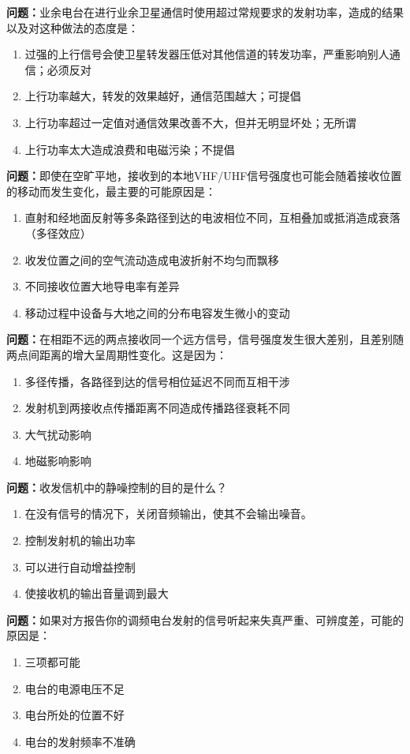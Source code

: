 \documentclass{ctexbook}
\begin{document}
\textbf{问题：}业余电台在进行业余卫星通信时使用超过常规要求的发射功率，造成的结果以及对这种做法的态度是：
\begin{enumerate}[label=\Alph*), leftmargin=3em]
\item 过强的上行信号会使卫星转发器压低对其他信道的转发功率，严重影响别人通信；必须反对
\item 上行功率越大，转发的效果越好，通信范围越大；可提倡
\item 上行功率超过一定值对通信效果改善不大，但并无明显坏处；无所谓
\item 上行功率太大造成浪费和电磁污染；不提倡
\end{enumerate}

\textbf{问题：}即使在空旷平地，接收到的本地VHF/UHF信号强度也可能会随着接收位置的移动而发生变化，最主要的可能原因是：
\begin{enumerate}[label=\Alph*), leftmargin=3em]
\item 直射和经地面反射等多条路径到达的电波相位不同，互相叠加或抵消造成衰落（多径效应）
\item 收发位置之间的空气流动造成电波折射不均匀而飘移
\item 不同接收位置大地导电率有差异
\item 移动过程中设备与大地之间的分布电容发生微小的变动
\end{enumerate}

\textbf{问题：}在相距不远的两点接收同一个远方信号，信号强度发生很大差别，且差别随两点间距离的增大呈周期性变化。这是因为：
\begin{enumerate}[label=\Alph*), leftmargin=3em]
\item 多径传播，各路径到达的信号相位延迟不同而互相干涉
\item 发射机到两接收点传播距离不同造成传播路径衰耗不同
\item 大气扰动影响
\item 地磁影响影响
\end{enumerate}

\textbf{问题：}收发信机中的静噪控制的目的是什么？
\begin{enumerate}[label=\Alph*), leftmargin=3em]
\item 在没有信号的情况下，关闭音频输出，使其不会输出噪音。
\item 控制发射机的输出功率
\item 可以进行自动增益控制
\item 使接收机的输出音量调到最大
\end{enumerate}

\textbf{问题：}如果对方报告你的调频电台发射的信号听起来失真严重、可辨度差，可能的原因是：
\begin{enumerate}[label=\Alph*), leftmargin=3em]
\item 三项都可能
\item 电台的电源电压不足
\item 电台所处的位置不好
\item 电台的发射频率不准确
\end{enumerate}
\end{document}
